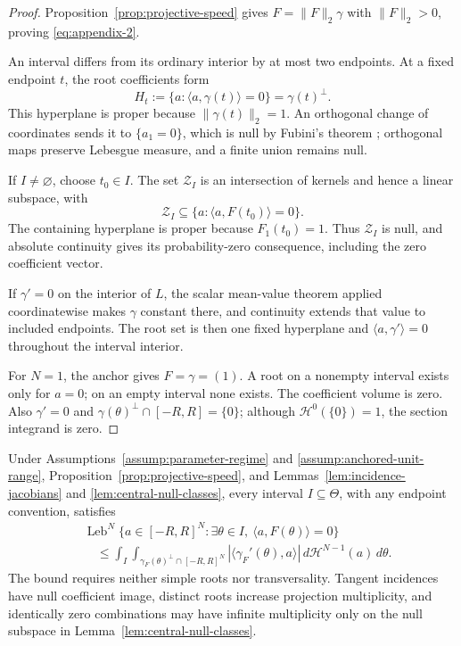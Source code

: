 \begin{proof}
Proposition~\ref{prop:projective-speed} gives
$F=\|F\|_2\gamma$ with $\|F\|_2>0$, proving \eqref{eq:appendix-2}.

An interval differs from its ordinary interior by at most two endpoints.  At
a fixed endpoint $t$, the root coefficients form
\[
H_t:=\{a:\langle a,\gamma(t)\rangle=0\}=\gamma(t)^\perp.
\]
This hyperplane is proper because $\|\gamma(t)\|_2=1$.  An orthogonal change
of coordinates sends it to $\{a_1=0\}$, which is null by Fubini's theorem
\citep{bogachev2007measure}; orthogonal
maps preserve Lebesgue measure, and a finite union remains null.

If $I\neq\varnothing$, choose $t_0\in I$.  The set $\mathcal Z_I$ is an
intersection of kernels and hence a linear subspace, with
\[
\mathcal Z_I\subseteq\{a:\langle a,F(t_0)\rangle=0\}.
\]
The containing hyperplane is proper because $F_1(t_0)=1$.  Thus
$\mathcal Z_I$ is null, and absolute continuity gives its probability-zero
consequence, including the zero coefficient vector.

If $\gamma'=0$ on the interior of $L$, the scalar mean-value theorem
\citep{rudin1976principles} applied
coordinatewise makes $\gamma$ constant there, and continuity extends that
value to included endpoints.  The root set is then one fixed hyperplane and
$\langle a,\gamma'\rangle=0$ throughout the interval interior.

For $N=1$, the anchor gives $F=\gamma=(1)$.  A root on a nonempty interval
exists only for $a=0$; on an empty interval none exists.  The coefficient
volume is zero.  Also $\gamma'=0$ and
$\gamma(\theta)^\perp\cap[-R,R]=\{0\}$; although
$\mathcal H^0(\{0\})=1$, the section integrand is zero.
\end{proof}

\begin{proposition}
\label{prop:central-volume}
Under Assumptions~\ref{assump:parameter-regime} and
\ref{assump:anchored-unit-range}, Proposition~\ref{prop:projective-speed},
and Lemmas~\ref{lem:incidence-jacobians} and
\ref{lem:central-null-classes}, every interval $I\subseteq\Theta$, with any
endpoint convention, satisfies
\begin{equation}
\begin{aligned}
&\operatorname{Leb}^N
\{a\in[-R,R]^N:\exists\theta\in I,
  \ \langle a,F(\theta)\rangle=0\}\\
&\quad\leq
\int_I\int_{\gamma_F(\theta)^\perp\cap[-R,R]^N}
 |\langle\gamma_F'(\theta),a\rangle|
 \,d\mathcal H^{N-1}(a)\,d\theta.
\end{aligned}
\label{eq:appendix-3}
\end{equation}
The bound requires neither simple roots nor transversality.  Tangent
incidences have null coefficient image, distinct roots increase projection
multiplicity, and identically zero combinations may have infinite
multiplicity only on the null subspace in
Lemma~\ref{lem:central-null-classes}.
\end{proposition}

